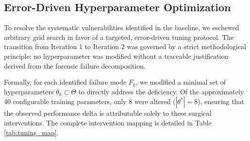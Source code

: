 \subsection{Error-Driven Hyperparameter Optimization}
\label{subsec:error_driven_tuning}

To resolve the systematic vulnerabilities identified in the baseline, we eschewed arbitrary grid search in favor of a targeted, error-driven tuning protocol. The transition from Iteration 1 to Iteration 2 was governed by a strict methodological principle: no hyperparameter was modified without a traceable justification derived from the forensic failure decomposition. 

Formally, for each identified failure mode $F_k$, we modified a minimal set of hyperparameters $\theta_k \subset \Theta$ to directly address the deficiency. Of the approximately 40 configurable training parameters, only 8 were altered ($|\theta^*| = 8$), ensuring that the observed performance delta is attributable solely to these surgical interventions. The complete intervention mapping is detailed in Table \ref{tab:tuning_map}.

\begin{table}[!t]
\centering
\caption{Targeted Hyperparameter Interventions mapping architectural modifications to baseline failure modes.}
\label{tab:tuning_map}
\end{table}

